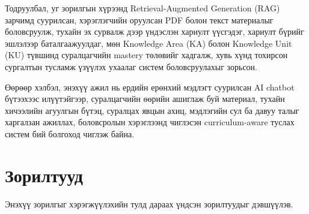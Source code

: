 \documentclass[12pt,A4]{report}
\newcommand{\eng}[1]{#1}
\begin{document}
Тодруулбал, уг зорилгын хүрээнд \eng{Retrieval-Augmented Generation (RAG)} зарчимд суурилсан, хэрэглэгчийн оруулсан \eng{PDF} болон текст материалыг боловсруулж, тухайн эх сурвалж дээр үндэслэн хариулт үүсгэдэг, хариулт бүрийг эшлэлээр баталгаажуулдаг, мөн \eng{Knowledge Area (KA)} болон \eng{Knowledge Unit (KU)} түвшинд суралцагчийн \eng{mastery} төлөвийг хадгалж, хувь хүнд тохирсон сургалтын тусламж үзүүлэх ухаалаг систем боловсруулахыг зорьсон.

Өөрөөр хэлбэл, энэхүү ажил нь ердийн ерөнхий мэдлэгт суурилсан \eng{AI chatbot} бүтээхээс илүүтэйгээр, суралцагчийн өөрийн ашиглаж буй материал, тухайн хичээлийн агуулгын бүтэц, суралцах явцын ахиц, мэдлэгийн сул ба давуу талыг харгалзан ажиллах, боловсролын хэрэглээнд чиглэсэн \eng{curriculum-aware} туслах систем бий болгоход чиглэж байна.

\section*{Зорилтууд}

Энэхүү зорилгыг хэрэгжүүлэхийн тулд дараах үндсэн зорилтуудыг дэвшүүлэв.
\end{document}
